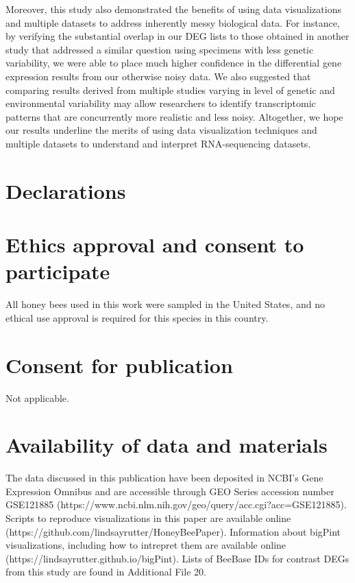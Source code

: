 \documentclass{bmcart}
\begin{document}
\begin{linenumbers}
\begin{doublespacing}
Moreover, this study also demonstrated the benefits of using data visualizations and multiple datasets to address inherently messy biological data. For instance, by verifying the substantial overlap in our DEG lists to those obtained in another study that addressed a similar question using specimens with less genetic variability, we were able to place much higher confidence in the differential gene expression results from our otherwise noisy data. We also suggested that comparing results derived from multiple studies varying in level of genetic and environmental variability may allow researchers to identify transcriptomic patterns that are concurrently more realistic and less noisy. Altogether, we hope our results underline the merits of using data visualization techniques and multiple datasets to understand and interpret RNA-sequencing datasets.

\end{doublespacing} %


\section*{Declarations}

\begin{backmatter}

\section*{Ethics approval and consent to participate}
  All honey bees used in this work were sampled in the United States, and no ethical use approval is required for this species in this country.

\section*{Consent for publication}
  Not applicable.

\section*{Availability of data and materials}
  The data discussed in this publication have been deposited in NCBI's Gene Expression Omnibus \cite{geo} and are accessible through GEO Series accession number GSE121885 (https://www.ncbi.nlm.nih.gov/geo/query/acc.cgi?acc=GSE121885). Scripts to reproduce visualizations in this paper are available online (https://github.com/lindsayrutter/HoneyBeePaper). Information about bigPint visualizations, including how to intrepret them are available online (https://lindsayrutter.github.io/bigPint). Lists of BeeBase IDs for contrast DEGs from this study are found in Additional File 20. 


\end{backmatter}
\end{linenumbers}
\end{document}
